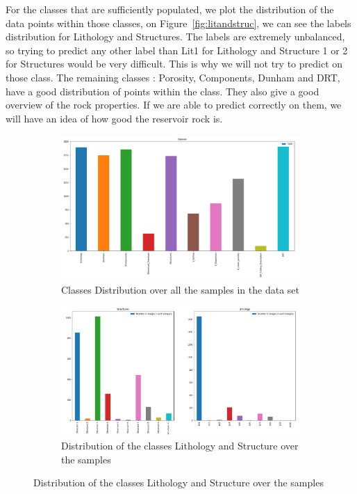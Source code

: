  For the classes that are sufficiently populated, we plot the distribution of the data points within those classes, on Figure~\ref{fig:litandstruc}, we can see the labels distribution for Lithology and Structures. The labels are extremely unbalanced, so trying to predict any other label than Lit1 for Lithology and Structure 1 or 2 for Structures would be very difficult. This is why we will not try to predict on those class. 
 The remaining classes : Porosity, Components, Dunham and DRT, have a good distribution of points within the class. They also give a good overview of the rock properties. If we are able to predict correctly on them, we will have an idea of how good the reservoir rock is. 
\begin{figure}
\begin{subfigure}{.5\textwidth}
  \centering
  \includegraphics[width=.8\linewidth]{figures/03-classes.png}
  \caption{Classes Distribution over all the samples in the data set}
  \label{fig:classes}
\end{subfigure}%
\begin{subfigure}{.5\textwidth}
  \centering
  \includegraphics[width=.8\linewidth]{figures/03-boob.PNG}
  \caption{Distribution of the classes Lithology and Structure over the samples}
  \label{fig:litandstruct}
\end{subfigure}
\end{figure}
